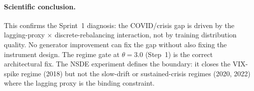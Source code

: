 \paragraph{Scientific conclusion.}
This confirms the Sprint~1 diagnosis: the COVID/crisis gap is driven
by the lagging-proxy $\times$ discrete-rebalancing interaction, not
by training distribution quality. No generator improvement can fix
the gap without also fixing the instrument design. The regime gate
at $\theta = 3.0$ (Step~1) is the correct architectural fix.
The NSDE experiment defines the boundary: it closes the
VIX-spike regime (2018) but not the slow-drift or sustained-crisis
regimes (2020, 2022) where the lagging proxy is the binding constraint.
